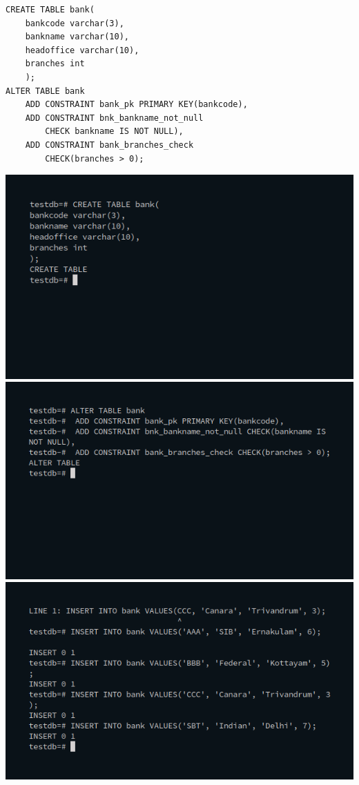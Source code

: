 \begin{enumerate}
\begin{enumerate}
\begin{verbatim}
CREATE TABLE bank(
	bankcode varchar(3),
	bankname varchar(10),
	headoffice varchar(10),
	branches int
	);
ALTER TABLE bank 
	ADD CONSTRAINT bank_pk PRIMARY KEY(bankcode),
	ADD CONSTRAINT bnk_bankname_not_null 
		CHECK bankname IS NOT NULL),
	ADD CONSTRAINT bank_branches_check 
		CHECK(branches > 0);

\end{verbatim}
\newline
\includegraphics[width=\linewidth]{../Images/Constraints/8.png}\newline
\newline
\includegraphics[width=\linewidth]{../Images/Constraints/9.png}\newline
\newline
\includegraphics[width=\linewidth]{../Images/Constraints/10.png}\newline

\end{enumerate}
\end{enumerate}
